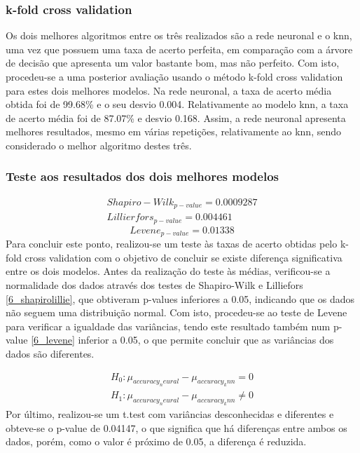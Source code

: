 \documentclass[conference]{IEEEtran}
\begin{document}
\subsubsection{k-fold cross validation}
Os dois melhores algoritmos entre os três realizados são a rede neuronal e o knn, uma vez que possuem uma taxa de acerto perfeita, em comparação com a árvore de decisão que apresenta um valor bastante bom, mas não perfeito.
Com isto, procedeu-se a uma posterior avaliação usando o método k-fold cross validation para estes dois melhores modelos. Na rede neuronal, a taxa de acerto média obtida foi de 99.68\% e o seu desvio 0.004. Relativamente ao modelo knn, a taxa de acerto média foi de 87.07\% e desvio 0.168. Assim, a rede neuronal apresenta melhores resultados, mesmo em várias repetições, relativamente ao knn, sendo considerado o melhor algoritmo destes três.


\subsubsection{Teste aos resultados dos dois melhores modelos}
\begin{equation}
  \begin{array}{l}
	Shapiro-Wilk_{p-value}=0.0009287 \\
	Lillierfors_{p-value}=0.004461
	\end{array}\label{6_shapirolillie}
\end{equation}
\begin{equation}
Levene_{p-value}=0.01338\label{6_levene}
\end{equation}
Para concluir este ponto, realizou-se um teste às taxas de acerto obtidas pelo k-fold cross validation com o objetivo de concluir se existe diferença significativa entre os dois modelos. Antes da realização do teste às médias, verificou-se a normalidade dos dados através dos testes de Shapiro-Wilk e Lilliefors \eqref{6_shapirolillie}, que obtiveram p-values inferiores a 0.05, indicando que os dados não seguem uma distribuição normal. Com isto, procedeu-se ao teste de Levene para verificar a igualdade das variâncias, tendo este resultado também num p-value \eqref{6_levene} inferior a 0.05, o que permite concluir que as variâncias dos dados são diferentes.

\begin{equation}
  \begin{array}{l}
    H_{0}:\mu _{accuracy_neural} - \mu _{accuracy_knn}=0 \\ 
    H_{1}:\mu _{accuracy_neural} - \mu _{accuracy_knn}\neq 0
  \end{array}\label{4_hypothesis}
\end{equation}
Por último, realizou-se um t.test com variâncias desconhecidas e diferentes e obteve-se o p-value de 0.04147, o que significa que há diferenças entre ambos os dados, porém, como o valor é próximo de 0.05, a diferença é reduzida.
\end{document}
